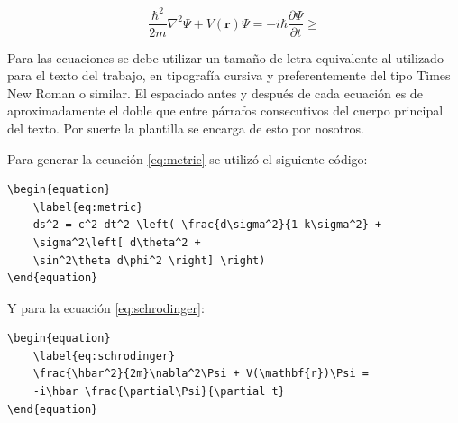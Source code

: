 \begin{equation}
	\label{eq:schrodinger}
	\frac{\hbar^2}{2m}\nabla^2\Psi + V(\mathbf{r})\Psi = -i\hbar \frac{\partial\Psi}{\partial t} \geq
\end{equation}

Para las ecuaciones se debe utilizar un tamaño de letra equivalente al utilizado para el texto del trabajo, en tipografía cursiva y preferentemente del tipo Times New Roman o similar. El espaciado antes y después de cada ecuación es de aproximadamente el doble que entre párrafos consecutivos del cuerpo principal del texto. Por suerte la plantilla se encarga de esto por nosotros.

Para generar la ecuación \ref{eq:metric} se utilizó el siguiente código:

\begin{verbatim}
\begin{equation}
	\label{eq:metric}
	ds^2 = c^2 dt^2 \left( \frac{d\sigma^2}{1-k\sigma^2} + 
	\sigma^2\left[ d\theta^2 + 
	\sin^2\theta d\phi^2 \right] \right)
\end{equation}
\end{verbatim}

Y para la ecuación \ref{eq:schrodinger}:

\begin{verbatim}
\begin{equation}
	\label{eq:schrodinger}
	\frac{\hbar^2}{2m}\nabla^2\Psi + V(\mathbf{r})\Psi =
	-i\hbar \frac{\partial\Psi}{\partial t}
\end{equation}

\end{verbatim}